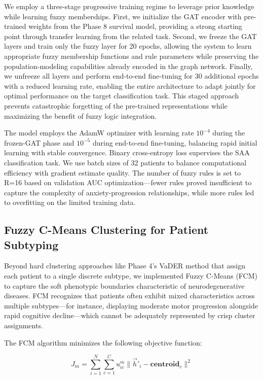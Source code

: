 \documentclass[conference]{IEEEtran}
\begin{document}
We employ a three-stage progressive training regime to leverage prior knowledge while learning fuzzy memberships. First, we initialize the GAT encoder with pre-trained weights from the Phase 8 survival model, providing a strong starting point through transfer learning from the related task. Second, we freeze the GAT layers and train only the fuzzy layer for 20 epochs, allowing the system to learn appropriate fuzzy membership functions and rule parameters while preserving the population-modeling capabilities already encoded in the graph network. Finally, we unfreeze all layers and perform end-to-end fine-tuning for 30 additional epochs with a reduced learning rate, enabling the entire architecture to adapt jointly for optimal performance on the target classification task. This staged approach prevents catastrophic forgetting of the pre-trained representations while maximizing the benefit of fuzzy logic integration.

The model employs the AdamW optimizer with learning rate $10^{-4}$ during the frozen-GAT phase and $10^{-5}$ during end-to-end fine-tuning, balancing rapid initial learning with stable convergence. Binary cross-entropy loss supervises the SAA classification task. We use batch sizes of 32 patients to balance computational efficiency with gradient estimate quality. The number of fuzzy rules is set to R=16 based on validation AUC optimization—fewer rules proved insufficient to capture the complexity of anxiety-progression relationships, while more rules led to overfitting on the limited training data.

\subsection{Fuzzy C-Means Clustering for Patient Subtyping}

Beyond hard clustering approaches like Phase 4's VaDER method that assign each patient to a single discrete subtype, we implemented Fuzzy C-Means (FCM) \cite{bezdek1981pattern} to capture the soft phenotypic boundaries characteristic of neurodegenerative diseases. FCM recognizes that patients often exhibit mixed characteristics across multiple subtypes—for instance, displaying moderate motor progression alongside rapid cognitive decline—which cannot be adequately represented by crisp cluster assignments.

The FCM algorithm minimizes the following objective function:

\begin{equation}
J_m = \sum_{i=1}^{N} \sum_{c=1}^{C} u_{ic}^m \|\vec{h}'_i - \mathbf{centroid}_c\|^2
\end{equation}
\end{document}
